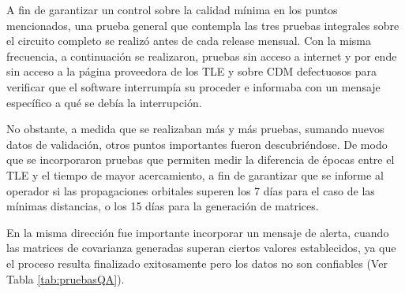 A fin de garantizar un control sobre la calidad m\'inima en los puntos mencionados, una prueba general que contempla las tres pruebas integrales sobre el circuito completo se realiz\'o antes de cada release mensual. Con la misma frecuencia, a continuaci\'on se realizaron, pruebas sin acceso a internet y por ende sin acceso a la p\'agina proveedora de los TLE y sobre CDM defectuosos para verificar que el software interrump\'ia su proceder e informaba con un mensaje espec\'ifico a qu\'e se deb\'ia la interrupci\'on.

No obstante, a medida que se realizaban m\'as y m\'as pruebas, sumando nuevos datos de validaci\'on, otros puntos importantes fueron descubri\'endose. De modo que se incorporaron pruebas que permiten medir la diferencia de \'epocas entre el TLE y el tiempo de mayor acercamiento, a fin de garantizar que se informe al operador si las propagaciones orbitales superen los 7 d\'ias para el caso de las m\'inimas distancias, o los 15 d\'ias para la generaci\'on de matrices. 

En la misma direcci\'on fue importante incorporar un mensaje de alerta, cuando las matrices de covarianza generadas superan ciertos valores establecidos, ya que el proceso resulta finalizado exitosamente pero los datos no son confiables (Ver Tabla \ref{tab:pruebasQA}).

\begin{table}[!h]
\caption[Pruebas de Aseguramiento de la Calidad]{Pruebas de Aseguramiento de la Calidad que se realizaron antes de cada release, aproximadamente una vez al mes.}
\label{tab:pruebasQA}
\end{table}


